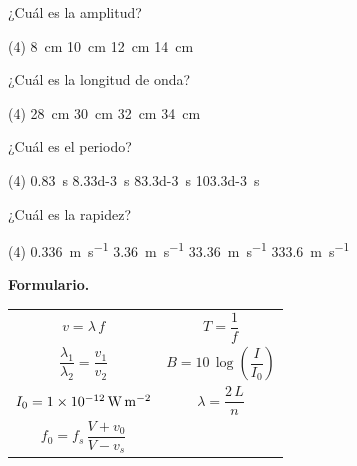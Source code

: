 \documentclass[12pt, letter]{exam}
\begin{document}
\begin{questions}
\begin{figure}[H]
    \end{figure}
    \question \label{completa_grafica_01} ¿Cuál es la amplitud?
    \begin{tasks}(4)
        \task \SI{8}{\centi\meter}
        \task \SI{10}{\centi\meter}
        \task \SI{12}{\centi\meter}
        \task \SI{14}{\centi\meter}
    \end{tasks}
    \question \label{completa_grafica_02} ¿Cuál es la longitud de onda?
    \begin{tasks}(4)
        \task \SI{28}{\centi\meter}
        \task \SI{30}{\centi\meter}
        \task \SI{32}{\centi\meter}
        \task \SI{34}{\centi\meter}
    \end{tasks}
    \question \label{completa_grafica_03} ¿Cuál es el periodo?
    \begin{tasks}(4)
        \task \SI{0.83}{\second}
        \task \SI{8.33d-3}{\second}
        \task \SI{83.3d-3}{\second}
        \task \SI{103.3d-3}{\second}
    \end{tasks}
    \question \label{completa_grafica_04} ¿Cuál es la rapidez?
    \begin{tasks}(4)
        \task \SI{0.336}{\meter\per\second}
        \task \SI{3.36}{\meter\per\second}
        \task \SI{33.36}{\meter\per\second}
        \task \SI{333.6}{\meter\per\second}
    \end{tasks}
\end{questions}

\newpage

\textbf{\huge{Formulario.}}
\begin{table}[H]
    \centering
    \setlength{\tabcolsep}{40pt}
    \renewcommand{\arraystretch}{2.5}
    \begin{tabular}{c  c}
            $v = \lambda \, f$ & $T = \dfrac{1}{f}$ \\
		    $\dfrac{\lambda_{1}}{\lambda_{2}} = \dfrac{v_{1}}{v_{2}}$ & $B = 10 \, \log \left( \dfrac{I}{I_{0}} \right)$ \\
            $I_{0} = \SI{1d-12}{\watt\per\square\meter}$ & $\lambda = \dfrac{2 \, L}{n}$ \\
            $f_{0} = f_{s} \, \dfrac{V + v_{0}}{V - v_{s}}$ &  \\
\end{tabular}
\end{table}
\end{document}
